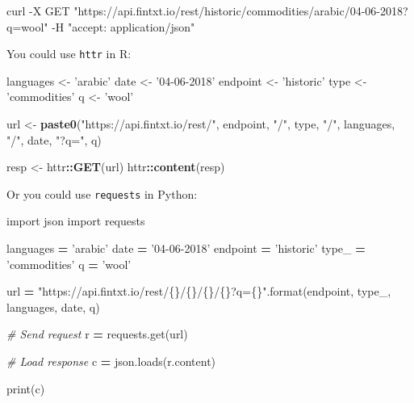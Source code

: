 \documentclass[]{book}
\newenvironment{Shaded}{\begin{snugshade}}{\end{snugshade}}
\newcommand{\KeywordTok}[1]{\textcolor[rgb]{0.13,0.29,0.53}{\textbf{#1}}}
\newcommand{\SpecialCharTok}[1]{\textcolor[rgb]{0.00,0.00,0.00}{#1}}
\newcommand{\StringTok}[1]{\textcolor[rgb]{0.31,0.60,0.02}{#1}}
\newcommand{\ImportTok}[1]{#1}
\newcommand{\CommentTok}[1]{\textcolor[rgb]{0.56,0.35,0.01}{\textit{#1}}}
\newcommand{\OperatorTok}[1]{\textcolor[rgb]{0.81,0.36,0.00}{\textbf{#1}}}
\newcommand{\BuiltInTok}[1]{#1}
\newcommand{\ExtensionTok}[1]{#1}
\newcommand{\NormalTok}[1]{#1}
\theoremstyle{definition}
\theoremstyle{definition}
\theoremstyle{definition}
\theoremstyle{remark}
\begin{document}
\begin{Shaded}
\begin{Highlighting}[]
\ExtensionTok{curl}\NormalTok{ -X GET }\StringTok{"https://api.fintxt.io/rest/historic/commodities/arabic/04-06-2018?q=wool"}\NormalTok{ -H  }\StringTok{"accept: application/json"}
\end{Highlighting}
\end{Shaded}

You could use \texttt{httr} in R:

\begin{Shaded}
\begin{Highlighting}[]
\NormalTok{languages <-}\StringTok{ 'arabic'}
\NormalTok{date <-}\StringTok{ '04-06-2018'}
\NormalTok{endpoint <-}\StringTok{ 'historic'}
\NormalTok{type <-}\StringTok{ 'commodities'}
\NormalTok{q <-}\StringTok{ 'wool'}

\NormalTok{url <-}\StringTok{ }\KeywordTok{paste0}\NormalTok{(}\StringTok{"https://api.fintxt.io/rest/"}\NormalTok{, endpoint, }\StringTok{"/"}\NormalTok{, type, }\StringTok{"/"}\NormalTok{, languages, }\StringTok{"/"}\NormalTok{, date, }\StringTok{"?q="}\NormalTok{, q)}

\NormalTok{resp <-}\StringTok{ }\NormalTok{httr}\OperatorTok{::}\KeywordTok{GET}\NormalTok{(url)}
\NormalTok{httr}\OperatorTok{::}\KeywordTok{content}\NormalTok{(resp)}
\end{Highlighting}
\end{Shaded}

Or you could use \texttt{requests} in Python:

\begin{Shaded}
\begin{Highlighting}[]
\ImportTok{import}\NormalTok{ json}
\ImportTok{import}\NormalTok{ requests}

\NormalTok{languages }\OperatorTok{=} \StringTok{'arabic'}
\NormalTok{date }\OperatorTok{=} \StringTok{'04-06-2018'}
\NormalTok{endpoint }\OperatorTok{=} \StringTok{'historic'}
\NormalTok{type_ }\OperatorTok{=} \StringTok{'commodities'}
\NormalTok{q }\OperatorTok{=} \StringTok{'wool'}

\NormalTok{url }\OperatorTok{=} \StringTok{"https://api.fintxt.io/rest/}\SpecialCharTok{\{\}}\StringTok{/}\SpecialCharTok{\{\}}\StringTok{/}\SpecialCharTok{\{\}}\StringTok{/}\SpecialCharTok{\{\}}\StringTok{?q=}\SpecialCharTok{\{\}}\StringTok{"}\NormalTok{.}\BuiltInTok{format}\NormalTok{(endpoint, type_, languages, date, q)}

\CommentTok{# Send request }
\NormalTok{r }\OperatorTok{=}\NormalTok{ requests.get(url)}

\CommentTok{# Load response}
\NormalTok{c }\OperatorTok{=}\NormalTok{ json.loads(r.content)}

\BuiltInTok{print}\NormalTok{(c)}
\end{Highlighting}
\end{Shaded}
\end{document}
